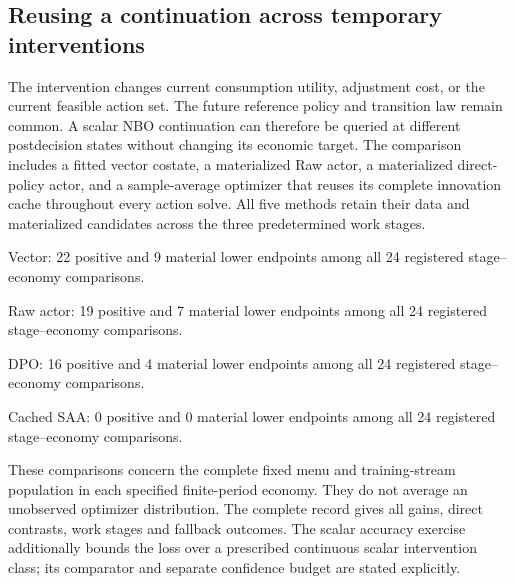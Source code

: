 \subsection{Reusing a continuation across temporary interventions}
\label{sec:r16menuevidence}
The intervention changes current consumption utility, adjustment cost, or the
current feasible action set. The future reference policy and transition law
remain common. A scalar NBO continuation can therefore be queried at different
postdecision states without changing its economic target. The comparison
includes a fitted vector costate, a materialized Raw actor, a materialized
direct-policy actor, and a sample-average optimizer that reuses its complete
innovation cache throughout every action solve. All five methods retain their
data and materialized candidates across the three predetermined work stages.




Vector: 22 positive and 9 material lower endpoints among all 24 registered stage--economy comparisons.

Raw actor: 19 positive and 7 material lower endpoints among all 24 registered stage--economy comparisons.

DPO: 16 positive and 4 material lower endpoints among all 24 registered stage--economy comparisons.

Cached SAA: 0 positive and 0 material lower endpoints among all 24 registered stage--economy comparisons.

These comparisons concern the complete fixed menu and training-stream
population in each specified finite-period economy. They do not average an
unobserved optimizer distribution. The complete record gives all gains,
direct contrasts, work stages and fallback outcomes. The scalar accuracy
exercise additionally bounds the loss over a prescribed continuous scalar
intervention class; its comparator and separate confidence budget are stated
explicitly.

